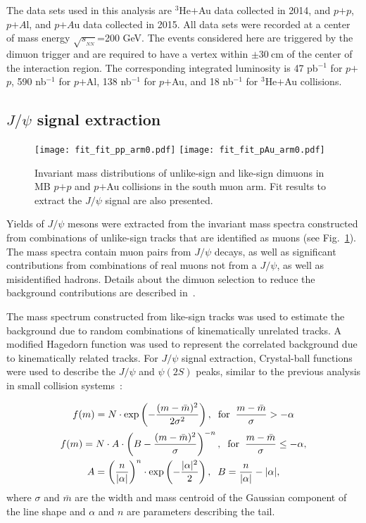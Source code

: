 \documentclass[twocolumn,letterpaper,aps,prc,longbibliography,superscriptaddress,nofootinbib,floatfix]{revtex4-1}
\newcommand{\pp}{\mbox{$p$$+$$p$}\xspace}
\newcommand{\pau}{\mbox{$p$$+$Au}\xspace}
\newcommand{\pal}{\mbox{$p$$+$Al}\xspace}
\newcommand{\heau}{\mbox{$^{3}$He$+$Au}\xspace}
\newcommand{\jpsi}{\mbox{$J/\psi$}\xspace}
\begin{document}
The data sets used in this analysis are \heau data collected in 2014, 
and \pp, $p$$+A$l, and $p$$+A$u data collected in 2015.  All data sets were 
recorded at a center of mass energy $\sqrt{s_{_{NN}}}$=200 GeV. The events 
considered here are triggered by the dimuon trigger and are required to 
have a vertex within $\pm 30~\mathrm{cm}$ of the center of the 
interaction region.  The corresponding integrated luminosity is 47 
pb$^{-1}$ for \pp, 590 nb$^{-1}$ for \pal, 138 nb$^{-1}$ for \pau, and 
18 nb$^{-1}$ for \heau collisions.


\subsection{\jpsi signal extraction}

\begin{figure}[htb]
\texttt{[image: fit\_fit\_pp\_arm0.pdf]}
\texttt{[image: fit\_fit\_pAu\_arm0.pdf]}
\caption{\label{fig:fit}
Invariant mass distributions of unlike-sign and like-sign dimuons in MB 
\pp and \pau collisions in the south muon arm. Fit results to extract 
the \jpsi signal are also presented.}
\end{figure}

Yields of \jpsi mesons were extracted from the invariant mass spectra 
constructed from combinations of unlike-sign tracks that are identified as 
muons (see Fig.~\ref{fig:fit}).  The mass spectra contain muon pairs from 
\jpsi decays, as well as significant contributions from combinations of real 
muons not from a \jpsi, as well as misidentified hadrons.  Details about the 
dimuon selection to reduce the background contributions are described 
in~\cite{Aidala:2018ajl,Adare:2011vq}.

The mass spectrum constructed from like-sign tracks was used to estimate 
the background due to random combinations of kinematically unrelated 
tracks. A modified Hagedorn function was used to represent the 
correlated background due to kinematically related tracks. For \jpsi 
signal extraction, Crystal-ball functions~\cite{Gaiser:1982yw} were used 
to describe the \jpsi and $\psi(2S)$ peaks, similar to the previous 
analysis in small collision systems~\cite{Adare:2016psx}:

\begin{multline}
f(m) = N  \cdot  {\rm exp} \left (-\frac{(m -\bar{m})^2}{2\sigma^2} \right ), \hspace {2mm} \small{{\rm for}\hspace{2mm} \frac{m-\bar{m}}{\sigma} > -\alpha }\\
f(m) = N  \cdot  A \cdot \left ( B -\frac{(m -\bar{m})^2}{\sigma} \right )^{-n}, \hspace {2mm} \small{{\rm for}\hspace{2mm} \frac{m-\bar{m}}{\sigma} \leq -\alpha},\\
A = \left ( \frac{n}{|\alpha|} \right )^n \cdot {\rm exp}\left ( 
-\frac{|\alpha|^2}{2} \right ), \hspace{2mm} B = \frac{n}{|\alpha|} - |\alpha|,
\end{multline}
where $\sigma$ and $\bar{m}$ are the width and mass centroid of the 
Gaussian component of the line shape and $\alpha$ and $n$ are parameters 
describing the tail.
\end{document}
